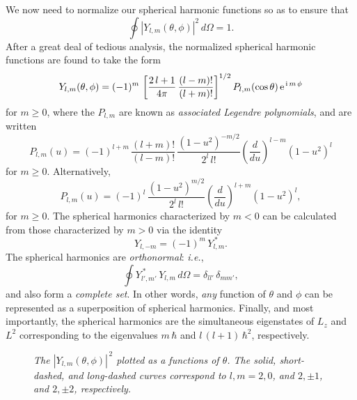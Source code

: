 We now need to normalize our spherical harmonic functions so as to ensure that
\begin{equation}
\oint |Y_{l,m}(\theta,\phi)|^2\,d\Omega = 1.
\end{equation}
After a great deal of tedious analysis, the normalized spherical
harmonic functions are found to take the form
\begin{equation}
Y_{l,m}(\theta,\phi) =(-1)^m\, \left[\frac{2\,l+1}{4\pi}\,\frac{(l-m)!}{(l+m)!}\right]^{1/2} P_{l,m}(\cos\theta)\,{\rm e}^{\,{\rm i}\,m\,\phi}
\end{equation}
for $m\geq 0$, where the $P_{l,m}$ are known as {\em associated Legendre
polynomials}, and are written
\begin{equation}
P_{l,m}(u) = (-1)^{l+m}\,\frac{(l+m)!}{(l-m)!}\,\frac{(1-u^2)^{-m/2}}{2^l\,l!}\left(\frac{d}{du}\right)^{l-m} (1-u^2)^l
\end{equation}
for $m\geq 0$. Alternatively,
\begin{equation}
P_{l,m}(u) = (-1)^{l}\,\frac{(1-u^2)^{m/2}}{2^l\,l!}\left(\frac{d}{du}\right)^{l+m} (1-u^2)^l,
\end{equation}
for $m\geq 0$. 
The spherical harmonics characterized by $m<0$ 
can be calculated from those characterized by $m>0$ via the identity
\begin{equation}
Y_{l,-m} = (-1)^m\,Y^{\,\ast}_{l,m}.
\end{equation}
The spherical harmonics are {\em orthonormal}: {\em i.e.}, 
\begin{equation}\label{spho}
\oint Y_{l',m'}^{\,\ast}\,Y_{l,m}\,d\Omega = \delta_{ll'}\,\delta_{mm'},
\end{equation}
and also form a {\em complete set}. In other words,
{\em any}\/ function of $\theta$ and $\phi$ can be represented as 
a superposition of spherical harmonics. Finally, and most importantly,
the spherical harmonics are the simultaneous eigenstates of $L_z$ and $L^2$
corresponding to the eigenvalues $m\,\hbar$ and $l\,(l+1)\,\hbar^2$,
respectively.

\begin{figure}
\epsfysize=3in
\centerline{}
\caption{\em The $|Y_{l,m}(\theta,\phi)|^{\,2}$ plotted as a functions of $\theta$. The solid, short-dashed, and long-dashed curves correspond to 
$l,m=2,0$,  and $2,\pm 1$, and $2,\pm 2$, respectively.}\label{ylm2}   
\end{figure}


